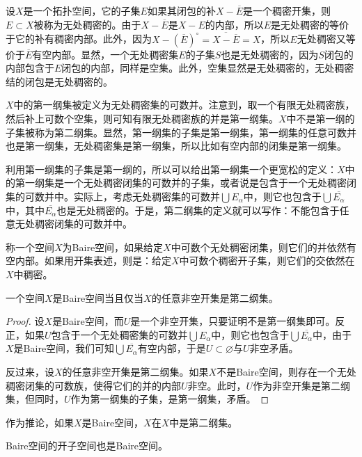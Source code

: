 \begin{para}
设$X$是一个拓扑空间，它的子集$E$如果其闭包的补$X-\overline{E}$是一个稠密开集，则$E\subset X$被称为无处稠密的。由于$X-\overline{E}$是$X-E$的内部，所以$E$是无处稠密的等价于它的补有稠密内部。此外，因为$X-(\overline{E})^\circ=\overline{X-\overline{E}}=X$，所以$E$无处稠密又等价于$\overline{E}$有空内部。显然，一个无处稠密集$E$的子集$S$也是无处稠密的，因为$S$闭包的内部包含于$E$闭包的内部，同样是空集。此外，空集显然是无处稠密的，无处稠密结的闭包是无处稠密的。

$X$中的第一纲集被定义为无处稠密集的可数并。注意到，取一个有限无处稠密族，然后补上可数个空集，则可知有限无处稠密族的并是第一纲集。$X$中不是第一纲的子集被称为第二纲集。显然，第一纲集的子集是第一纲集，第一纲集的任意可数并也是第一纲集，无处稠密集是第一纲集，所以比如有空内部的闭集是第一纲集。

利用第一纲集的子集是第一纲的，所以可以给出第一纲集一个更宽松的定义：$X$中的第一纲集是一个无处稠密闭集的可数并的子集，或者说是包含于一个无处稠密闭集的可数并中。实际上，考虑无处稠密集的可数并$\bigcup E_\alpha$中，则它也包含于$\bigcup \overline{E_\alpha}$中，其中$\overline{E_\alpha}$也是无处稠密的。于是，第二纲集的定义就可以写作：不能包含于任意无处稠密闭集的可数并中。

称一个空间$X$为Baire空间，如果给定$X$中可数个无处稠密闭集，则它们的并依然有空内部。如果用开集表述，则是：给定$X$中可数个稠密开子集，则它们的交依然在$X$中稠密。
\end{para}

\begin{lem}
	一个空间$X$是Baire空间当且仅当$X$的任意非空开集是第二纲集。
\end{lem}

\begin{proof}
	设$X$是Baire空间，而$U$是一个非空开集，只要证明不是第一纲集即可。反正，如果$U$包含于一个无处稠密集的可数并$\bigcup E_\alpha$中，则它也包含于$\bigcup \overline{E_\alpha}$中，由于$X$是Baire空间，我们可知$\bigcup \overline{E_\alpha}$有空内部，于是$U\subset \varnothing$与$U$非空矛盾。

	反过来，设$X$的任意非空开集是第二纲集。如果$X$不是Baire空间，则存在一个无处稠密闭集的可数族，使得它们的并的内部$U$非空。此时，$U$作为非空开集是第二纲集，但同时，$U$作为第一纲集的子集，是第一纲集，矛盾。
\end{proof}

作为推论，如果$X$是Baire空间，$X$在$X$中是第二纲集。

\begin{pro}
	Baire空间的开子空间也是Baire空间。
\end{pro}

